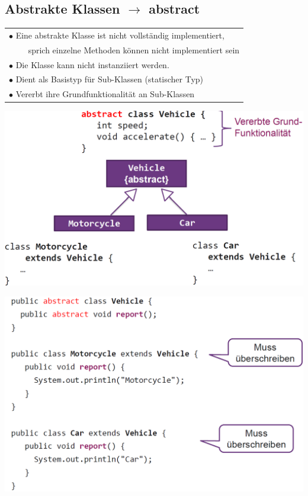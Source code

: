 {\subsection{Abstrakte Klassen $\rightarrow$ abstract}{\label{AbstractClass}}
    \begin{tabular}{l}
        $\bullet$ Eine abstrakte Klasse ist nicht vollständig implementiert,\\
        $\qquad$ sprich einzelne Methoden können nicht implementiert sein\\
        $\bullet$ Die Klasse kann nicht instanziiert werden.\\
        $\bullet$ Dient als Basistyp für Sub-Klassen (statischer Typ)\\
        $\bullet$ Vererbt ihre Grundfunktionalität an Sub-Klassen\\
    \end{tabular}

    \begin{minipage}{0.5\columnwidth}
        \begin{center}
            \includegraphics[width=0.9\columnwidth]{pictures/abstrakte-Klasse-Bsp.png}
        \end{center}
    \end{minipage}
    \hfill
    \begin{minipage}{0.5\columnwidth}
        \begin{center}
            \includegraphics[width=0.9\columnwidth]{pictures/abstrakte-Klasse-Bsp2.png}
        \end{center}
    \end{minipage}
    \vspace{-0.1cm}

}
